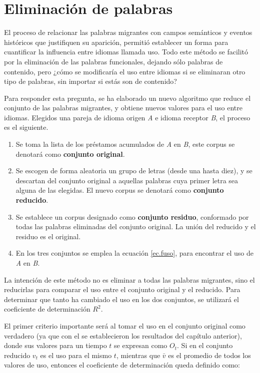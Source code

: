 \chapter{Eliminación de palabras}

El proceso de relacionar las palabras migrantes con campos semánticos y eventos históricos que justifiquen su aparición, permitió establecer un forma para cuantificar la influencia entre idiomas llamada uso. Todo este método se facilitó por la eliminación de las palabras funcionales, dejando sólo palabras de contenido, pero ¿cómo se modificaría el uso entre idiomas si se eliminaran otro tipo de palabras, sin importar si estás son de contenido?

Para responder esta pregunta, se ha elaborado un nuevo algoritmo que reduce el conjunto de las palabras migrantes, y  obtiene nuevos valores para el uso entre idiomas.  Elegidos una pareja de idioma origen \textit{A} e idioma receptor \textit{B}, el proceso es el siguiente. 


\begin{enumerate}
	
	\item Se toma la lista de los préstamos acumulados de \textit{A} en \textit{B},  este corpus se denotará como \textbf{conjunto original}.
	
	\item Se escogen de forma aleatoria un grupo de letras (desde una hasta diez), y se descartan del conjunto original a aquellas  palabras cuya primer letra sea alguna de las elegidas. El nuevo corpus se denotará como \textbf{conjunto reducido}.
	
	\item Se establece un corpus  designado como \textbf{conjunto residuo}, conformado por todas las palabras eliminadas del conjunto original.  La unión del reducido y el residuo es el original. 
	
	\item En los tres conjuntos se emplea la ecuación \ref{ec.fuso}, para encontrar el uso de \textit{A} en \textit{B}. 	
	
\end{enumerate}

La intención de este método  no es eliminar a todas las palabras migrantes, sino el reducirlas  para  comparar el uso entre el conjunto original y el reducido.  Para determinar que tanto ha cambiado el uso en los dos conjuntos, se utilizará el coeficiente de determinación $R^{2}$. 

El primer criterio importante será al tomar el uso en el conjunto original como verdadero (ya que con el se establecieron los resultados del capítulo anterior),  donde sus valores para un tiempo $t$ se expresan como $O_{t}$. Si en el conjunto reducido  $v_{t}$ es el uso para el mismo $t$, mientras que  $\bar{v}$ es el promedio de todos los valores de uso, entonces  el coeficiente de determinación queda definido como:

